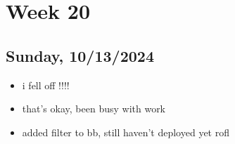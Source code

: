 \newpage
\section{Week 20}

\subsection*{Sunday, 10/13/2024}
\begin{itemize}
    \item i fell off !!!!
    \item that's okay, been busy with work
    \item added filter to bb, still haven't deployed yet rofl
\end{itemize}
